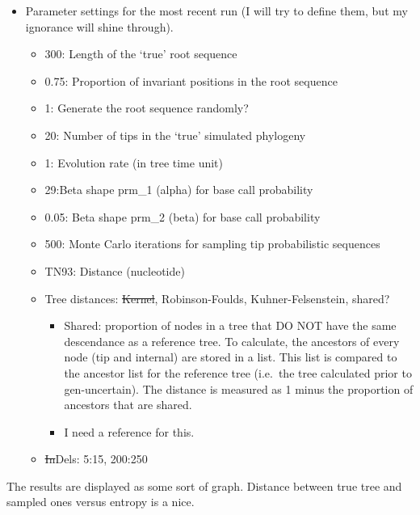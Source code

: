 \documentclass[
]{article}
\providecommand{\tightlist}{%
  \setlength{\itemsep}{0pt}\setlength{\parskip}{0pt}}
\begin{document}
\begin{itemize}
\tightlist
\item
  Parameter settings for the most recent run (I will try to define them,
  but my ignorance will shine through).

  \begin{itemize}
  \tightlist
  \item
    300: Length of the `true' root sequence
  \item
    0.75: Proportion of invariant positions in the root sequence
  \item
    1: Generate the root sequence randomly?
  \item
    20: Number of tips in the `true' simulated phylogeny
  \item
    1: Evolution rate (in tree time unit)
  \item
    29:Beta shape prm\_1 (alpha) for base call probability
  \item
    0.05: Beta shape prm\_2 (beta) for base call probability
  \item
    500: Monte Carlo iterations for sampling tip probabilistic sequences
  \item
    TN93: Distance (nucleotide)
  \item
    Tree distances: \sout{Kernel}, Robinson-Foulds, Kuhner-Felsenstein,
    shared?

    \begin{itemize}
    \tightlist
    \item
      Shared: proportion of nodes in a tree that DO NOT have the same
      descendance as a reference tree. To calculate, the ancestors of
      every node (tip and internal) are stored in a list. This list is
      compared to the ancestor list for the reference tree (i.e.~the
      tree calculated prior to gen-uncertain). The distance is measured
      as 1 minus the proportion of ancestors that are shared.
    \item
      I need a reference for this.
    \end{itemize}
  \item
    \sout{In}Dels: 5:15, 200:250
  \end{itemize}
\end{itemize}

The results are displayed as some sort of graph. Distance between true
tree and sampled ones versus entropy is a nice.
\end{document}
